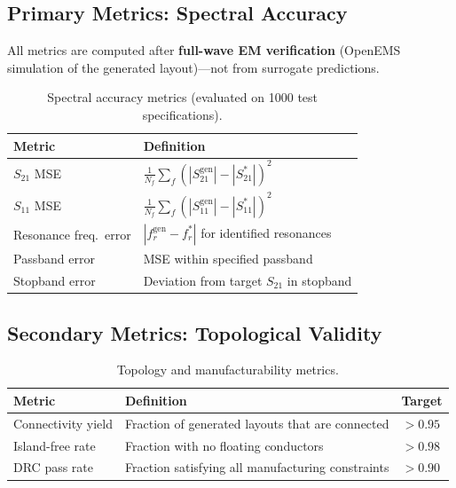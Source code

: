 \documentclass[12pt,a4paper]{article}
\theoremstyle{definition}
\theoremstyle{plain}
\theoremstyle{remark}
\begin{document}
\subsection{Primary Metrics: Spectral Accuracy}

All metrics are computed after \textbf{full-wave EM verification}
(OpenEMS simulation of the generated layout)—not from surrogate predictions.

\begin{table}[H]
\centering
\caption{Spectral accuracy metrics (evaluated on 1000 test specifications).}
\label{tab:metrics_spec}
\begin{tabularx}{\linewidth}{lX}
\toprule
\textbf{Metric} & \textbf{Definition} \\
\midrule
$S_{21}$ MSE & $\frac{1}{N_f}\sum_f (|S_{21}^{\mathrm{gen}}| - |S_{21}^*|)^2$ \\
$S_{11}$ MSE & $\frac{1}{N_f}\sum_f (|S_{11}^{\mathrm{gen}}| - |S_{11}^*|)^2$ \\
Resonance freq.\ error & $|f_r^{\mathrm{gen}} - f_r^*|$ for identified resonances \\
Passband error  & MSE within specified passband \\
Stopband error  & Deviation from target $S_{21}$ in stopband \\
\bottomrule
\end{tabularx}
\end{table}

\subsection{Secondary Metrics: Topological Validity}

\begin{table}[H]
\centering
\caption{Topology and manufacturability metrics.}
\label{tab:metrics_topo}
\begin{tabular}{lll}
\toprule
\textbf{Metric} & \textbf{Definition} & \textbf{Target} \\
\midrule
Connectivity yield   & Fraction of generated layouts that are connected  & $>0.95$ \\
Island-free rate     & Fraction with no floating conductors              & $>0.98$ \\
DRC pass rate        & Fraction satisfying all manufacturing constraints & $>0.90$ \\
\bottomrule
\end{tabular}
\end{table}
\end{document}
